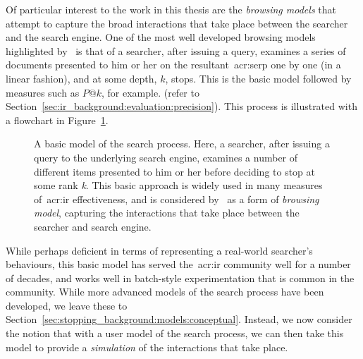 Of particular interest to the work in this thesis are the \emph{browsing models} that attempt to capture the broad interactions that take place between the searcher and the search engine. One of the most well developed browsing models highlighted by~\cite{carterette2011models} is that of a searcher, after issuing a query, examines a series of documents presented to him or her on the resultant~\gls{acr:serp} one by one (in a linear fashion), and at some depth, $k$, stops. This is the basic model followed by measures such as $P@k$, for example. (refer to Section~\ref{sec:ir_background:evaluation:precision}). This process is illustrated with a flowchart in Figure~\ref{fig:basic_model}.

\begin{figure}[t!]
    \centering
    \caption[A basic user model of search]{A basic model of the search process. Here, a searcher, after issuing a query to the underlying search engine, examines a number of different items presented to him or her before deciding to stop at some rank \emph{k}. This basic approach is widely used in many measures of~\gls{acr:ir} effectiveness, and is considered by~\cite{carterette2011models} as a form of \emph{browsing model}, capturing the interactions that take place between the searcher and search engine.}
    \label{fig:basic_model}
\end{figure}

While perhaps deficient in terms of representing a real-world searcher's behaviours, this basic model has served the~\gls{acr:ir} community well for a number of decades, and works well in batch-style experimentation that is common in the community. While more advanced models of the search process have been developed, we leave these to Section~\ref{sec:stopping_background:models:conceptual}. Instead, we now consider the notion that with a user model of the search process, we can then take this model to provide a \emph{simulation} of the interactions that take place.

